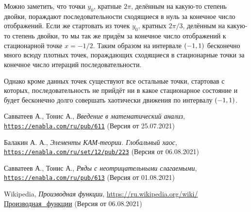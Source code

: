 \documentclass[12pt]{article}
\begin{document}
Можно заметить, что точки $y_0$, кратные $2\pi$, делённым на какую\--то степень двойки, пораждают последовательности сходящиеся в нуль за конечное число отображений. Если же стартовать из точек $y_0$, кратных $2\pi/3$, делённым на какую\--то степень двойки, то мы так же придём за конечное число отображений к стационарной точке $x = -1/2$. Таким образом на интервале $\qty(-1,1)$ бесконечно много всюду плотных точек, пораждающих сходящиеся в стационарные точки за конечное число итераций последовательности.
\par
Однако кроме данных точек существуют все остальные точки, стартовав с которых, последовательность не прийдёт ни в какое стационарное состояние и будет бесконечно долго совершать хаотически движения по интервалу $\qty(-1,1)$.


\medskip 
\begin{thebibliography}{9}
Савватеев А., Тонис А., \textit{Введение в математический анализ},
\\\texttt{\url{https://enabla.com/ru/pub/611}} (Версия от 25.07.2021)

Балакин А. А., \textit{Элементы КАМ\--теории. Глобальный хаос},
\\\texttt{\url{https://enabla.com/ru/set/12/pub/223}} (Версия от 06.08.2021)

Савватеев А., Тонис А., \textit{Ряды с неотрицательными слагаемыми},
\\\texttt{\url{https://enabla.com/ru/pub/613}} (Версия от 01.08.2021)

Wikipedia, \textit{Производная функции},
\href{https://ru.wikipedia.org/wiki/\%D0\%9F\%D1\%80\%D0\%BE\%D0\%B8\%D0\%B7\%D0\%B2\%D0\%BE\%D0\%B4\%D0\%BD\%D0\%B0\%D1\%8F_\%D1\%84\%D1\%83\%D0\%BD\%D0\%BA\%D1\%86\%D0\%B8\%D0\%B8}{https://ru.wikipedia.org/wiki/Производная\_функции} (Версия от 06.08.2021)

\end{thebibliography}
\end{document}
